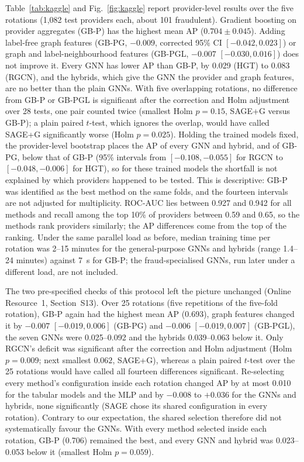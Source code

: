 \documentclass[pdflatex,sn-vancouver-num]{sn-jnl}
\newcommand{\SSecKaggle}{S13}\newcommand{\STabKaggleRepeated}{S9}\newcommand{\STabKaggleNested}{S10}
\begin{document}
Table~\ref{tab:kaggle} and Fig.~\ref{fig:kaggle} report provider-level
results over the five rotations (1{,}082 test providers each, about 101
fraudulent). Gradient boosting on provider aggregates (GB-P) has the highest
mean AP ($0.704\pm0.045$). Adding label-free graph features (GB-PG, $-0.009$,
corrected 95\% CI $[-0.042, 0.023]$) or graph and label-neighbourhood
features (GB-PGL, $-0.007$ $[-0.030, 0.016]$) does not improve it. Every GNN
has lower AP than GB-P, by 0.029 (HGT) to 0.083 (RGCN), and the hybrids,
which give the GNN the provider and graph features, are no better than the
plain GNNs. With five overlapping rotations, no difference from GB-P or GB-PGL
is significant after the correction and Holm adjustment over 28 tests, one pair
counted twice (smallest Holm $p=0.15$, SAGE+G versus GB-P); a plain paired $t$-test, which ignores the
overlap, would have called SAGE+G significantly worse (Holm $p=0.025$).
Holding the trained models fixed, the provider-level bootstrap places the AP
of every GNN and hybrid, and of GB-PG, below that of GB-P (95\% intervals
from $[-0.108, -0.055]$ for RGCN to $[-0.048, -0.006]$ for HGT), so for these
trained models the shortfall is not explained by which providers happened to be
tested. This is descriptive: GB-P was identified as the best method on the same
folds, and the fourteen intervals are not adjusted for multiplicity.
ROC-AUC lies between 0.927 and 0.942 for all methods and
recall among the top 10\% of providers between 0.59 and 0.65, so the methods
rank providers similarly; the AP differences come from the top of the
ranking. Under the same parallel load as before, median training time per
rotation was 2--15 minutes for the general-purpose GNNs and hybrids (range
1.4--24 minutes) against 7~s for GB-P; the fraud-specialised GNNs, run later
under a different load, are not included.

The two pre-specified checks of this protocol left the picture unchanged
(Online Resource~1, Section~\SSecKaggle). Over 25 rotations (five repetitions
of the five-fold rotation), GB-P again had the highest mean AP (0.693), graph
features changed it by $-0.007$ $[-0.019, 0.006]$ (GB-PG) and $-0.006$
$[-0.019, 0.007]$ (GB-PGL), the seven GNNs were 0.025--0.092 and the hybrids
0.039--0.063 below it. Only RGCN's deficit was significant after the
correction and Holm adjustment (Holm $p=0.009$; next smallest $0.062$,
SAGE+G), whereas a plain paired $t$-test over the 25 rotations would have
called all fourteen differences significant. Re-selecting every
method's configuration inside each rotation changed AP by at most 0.010 for
the tabular models and the MLP and by $-0.008$ to $+0.036$ for the GNNs and
hybrids, none significantly (SAGE chose its shared configuration in every
rotation). Contrary to our expectation, the shared selection therefore did
not systematically favour the GNNs. With every method selected inside each
rotation, GB-P (0.706) remained the best, and every GNN and hybrid was
0.023--0.053 below it (smallest Holm $p=0.059$).
\end{document}
